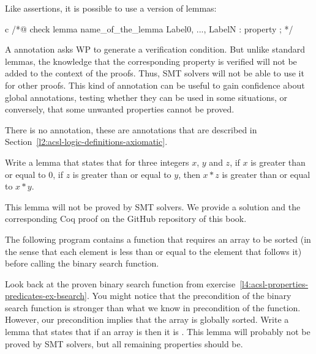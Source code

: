 Like assertions, it is possible to use a  version of lemmas:


\begin{CodeBlock}{c}
/*@
  check lemma name_of_the_lemma { Label0, ..., LabelN }:
    property ;
*/
\end{CodeBlock}


A  annotation asks WP to generate a verification
condition. But unlike standard lemmas, the knowledge that the
corresponding property is verified will not be added to the context of the
proofs. Thus, SMT solvers will not be able to use it for other proofs. This
kind of annotation can be useful to gain confidence about global annotations,
testing whether they can be used in some situations, or conversely, that
some unwanted properties cannot be proved.


There is no  annotation, these are 
annotations that are described in
Section~\ref{l2:acsl-logic-definitions-axiomatic}.








Write a lemma that states that for three integers $x$, $y$ and $z$, if $x$ is
greater than or equal to $0$, if $z$ is greater than or equal to $y$, then
$x * z$ is greater than or equal to $x * y$.


This lemma will not be proved by SMT solvers. We provide a solution and the
corresponding Coq proof on the GitHub repository of this book.


\label{l4:acsl-properties-lemmas-lsorted-gsorted}


The following program contains a function that requires an array to be sorted
(in the sense that each element is less than or equal to the element that
follows it) before calling the binary search function.




Look back at the proven binary search function from
exercise~\ref{l4:acsl-properties-predicates-ex-bsearch}. You might notice that
the precondition of the binary search function is stronger than what we know in
precondition of the  function. However, our precondition
implies that the array is globally sorted. Write a lemma that states that if
an array is  then it is .
This lemma will probably not be proved by SMT solvers, but all remaining properties
should be.

